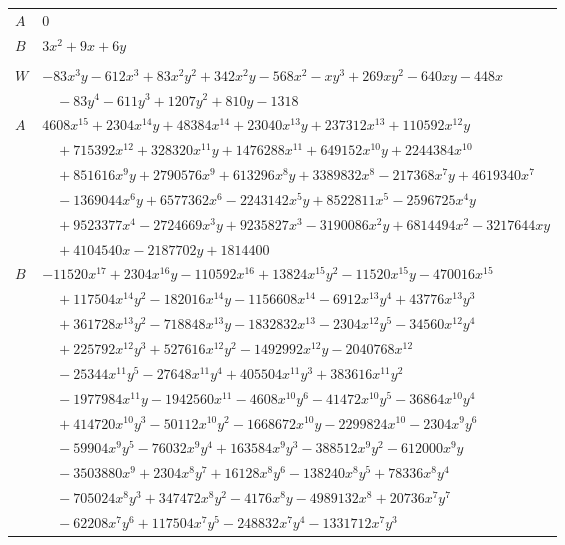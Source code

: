 \documentclass[11pt]{article}
\begin{document}
\begin{longtable}{@{}ll@{}}
$A$ & $0$\\
$B$ & $3x^{2}+9x+6y$\\
\addlinespace[3pt]
\multicolumn{2}{@{}l}{$i=32$, $m=48$, neighbours $31,41,48,55,58,62,66,77,85,105$}\\
$W$ & $-83x^{3}y-612x^{3}+83x^{2}y^{2}+342x^{2}y-568x^{2}-xy^{3}+269xy^{2}-640xy-448x$\\
 & $\quad -83y^{4}-611y^{3}+1207y^{2}+810y-1318$\\
$A$ & $4608x^{15}+2304x^{14}y+48384x^{14}+23040x^{13}y+237312x^{13}+110592x^{12}y$\\
 & $\quad +715392x^{12}+328320x^{11}y+1476288x^{11}+649152x^{10}y+2244384x^{10}$\\
 & $\quad +851616x^{9}y+2790576x^{9}+613296x^{8}y+3389832x^{8}-217368x^{7}y+4619340x^{7}$\\
 & $\quad -1369044x^{6}y+6577362x^{6}-2243142x^{5}y+8522811x^{5}-2596725x^{4}y$\\
 & $\quad +9523377x^{4}-2724669x^{3}y+9235827x^{3}-3190086x^{2}y+6814494x^{2}-3217644xy$\\
 & $\quad +4104540x-2187702y+1814400$\\
$B$ & $-11520x^{17}+2304x^{16}y-110592x^{16}+13824x^{15}y^{2}-11520x^{15}y-470016x^{15}$\\
 & $\quad +117504x^{14}y^{2}-182016x^{14}y-1156608x^{14}-6912x^{13}y^{4}+43776x^{13}y^{3}$\\
 & $\quad +361728x^{13}y^{2}-718848x^{13}y-1832832x^{13}-2304x^{12}y^{5}-34560x^{12}y^{4}$\\
 & $\quad +225792x^{12}y^{3}+527616x^{12}y^{2}-1492992x^{12}y-2040768x^{12}$\\
 & $\quad -25344x^{11}y^{5}-27648x^{11}y^{4}+405504x^{11}y^{3}+383616x^{11}y^{2}$\\
 & $\quad -1977984x^{11}y-1942560x^{11}-4608x^{10}y^{6}-41472x^{10}y^{5}-36864x^{10}y^{4}$\\
 & $\quad +414720x^{10}y^{3}-50112x^{10}y^{2}-1668672x^{10}y-2299824x^{10}-2304x^{9}y^{6}$\\
 & $\quad -59904x^{9}y^{5}-76032x^{9}y^{4}+163584x^{9}y^{3}-388512x^{9}y^{2}-612000x^{9}y$\\
 & $\quad -3503880x^{9}+2304x^{8}y^{7}+16128x^{8}y^{6}-138240x^{8}y^{5}+78336x^{8}y^{4}$\\
 & $\quad -705024x^{8}y^{3}+347472x^{8}y^{2}-4176x^{8}y-4989132x^{8}+20736x^{7}y^{7}$\\
 & $\quad -62208x^{7}y^{6}+117504x^{7}y^{5}-248832x^{7}y^{4}-1331712x^{7}y^{3}$\\

\end{longtable}
\end{document}
